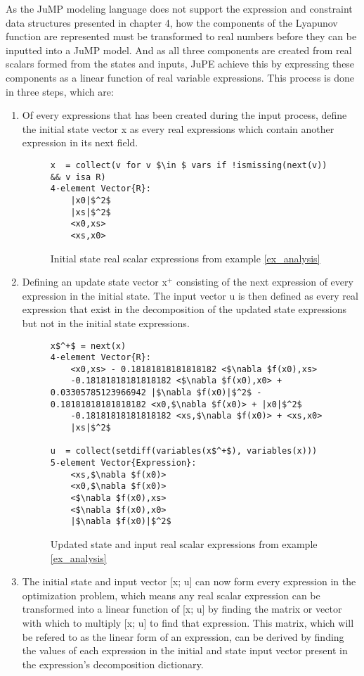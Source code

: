 As the JuMP modeling language does not support the expression and constraint data structures presented in chapter 4, how the components of the Lyapunov function are represented must be transformed to real numbers before they can be inputted into a JuMP model. And as all three components are created from real scalars formed from the states and inputs, JuPE achieve this by expressing these components as a linear function of real variable expressions. This process is done in three steps, which are:
\begin{enumerate}
    \item Of every expressions that has been created during the input process, define the initial state vector x as every real expressions which contain another expression in its next field.
\begin{figure}[h!]
    \begin{lstlisting}[mathescape]
x  = collect(v for v $\in $ vars if !ismissing(next(v)) && v isa R)
4-element Vector{R}:
    |x0|$^2$
    |xs|$^2$
    <x0,xs>
    <xs,x0>
\end{lstlisting}
\caption{Initial state real scalar expressions from example \ref{ex_analysis}}
\label{ex_initstate}
\end{figure}

    \item Defining an update state vector x$^+$ consisting of the next expression of every expression in the initial state. The input vector u is then defined as every real expression that exist in the decomposition of the updated state expressions but not in the initial state expressions.
    \begin{figure}[h!]
        \begin{lstlisting}[mathescape]    
x$^+$ = next(x)
4-element Vector{R}:
    <x0,xs> - 0.18181818181818182 <$\nabla $f(x0),xs>
    -0.18181818181818182 <$\nabla $f(x0),x0> + 0.03305785123966942 |$\nabla $f(x0)|$^2$ - 0.18181818181818182 <x0,$\nabla $f(x0)> + |x0|$^2$
    -0.18181818181818182 <xs,$\nabla $f(x0)> + <xs,x0>
    |xs|$^2$

u  = collect(setdiff(variables(x$^+$), variables(x)))
5-element Vector{Expression}:
    <xs,$\nabla $f(x0)>
    <x0,$\nabla $f(x0)>
    <$\nabla $f(x0),xs>
    <$\nabla $f(x0),x0>
    |$\nabla $f(x0)|$^2$
        \end{lstlisting}    
    \caption{Updated state and input real scalar expressions from example \ref{ex_analysis}}
    \label{ex_updatedstate_input}
    \end{figure}
    \item The initial state and input vector [x; u] can now form every expression in the optimization problem, which means any real scalar expression can be transformed into a linear function of [x; u] by finding the matrix or vector with which to multiply [x; u] to find that expression. This matrix, which will be refered to as the linear form of an expression, can be derived by finding the values of each expression in the initial and state input vector present in the expression's decomposition dictionary.
\end{enumerate}

